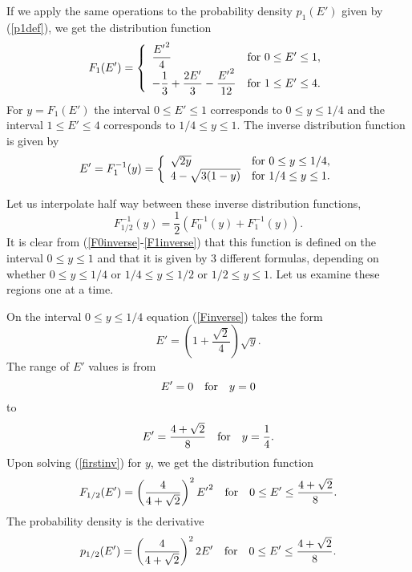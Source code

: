 \documentclass[11pt]{article}
\begin{document}
If we apply the same operations to the probability density
$p_1(E')$ given by (\ref{p1def}), we get the distribution
function
\[
  F_1(E') = \left\{
    \begin{array}{ll}
      {\displaystyle  \frac{{E'}^2}{4} }
         & \hbox{for $0 \le E' \le 1$}, \\
      {\displaystyle   -\frac{1}{3} + \frac{2E'}{3} - \frac{{E'}^2}{12} }
         & \hbox{for $1 \le E' \le 4$}.
    \end{array}
  \right.
\]
For $y = F_1(E')$ the interval $0 \le E' \le 1$ corresponds to
$0 \le y \le 1/4$ and the interval $1 \le E' \le 4$ corresponds 
to $1/4 \le y \le 1$.  The inverse distribution function is
given by
\begin{equation}
  E' = F_1^{-1}(y) = \left\{
    \begin{array}{ll}
      \sqrt{ 2y} & \hbox{for $0 \le y \le 1/4$}, \\
         4 - \sqrt{ 3(1-y) } & \hbox{for $1/4 \le y \le 1$}.
    \end{array}
  \right.
  \label{F1inverse}
\end{equation}

Let us interpolate half way between these inverse distribution functions,
\begin{equation}
  F_{1/2}^{-1}(y) = \frac{1}{2} ( F_0^{-1}(y) + F_1^{-1}(y) ).
 \label{Finverse}
\end{equation}
It is clear from (\ref{F0inverse}-\ref{F1inverse}) that this
function is defined on the interval $0 \le y \le 1$ and that
it is given by 3 different formulas, depending on whether
$0 \le y \le 1/4$ or $1/4 \le y \le 1/2$ or $1/2 \le y \le 1$.
Let us examine these regions one at a time.

On the interval $0 \le y \le 1/4$ equation (\ref{Finverse})
takes the form
\begin{equation}
  E' = \left(
    1 + \frac{\sqrt{2}}{4}
  \right)
  \sqrt{y}.
  \label{firstinv}
\end{equation}
The range of $E'$ values is from
\[
  E' = 0 \quad \hbox{for} \quad y = 0
\]
to
\[
  E' = \frac{4 + \sqrt{2}}{8} \quad \hbox{for} \quad y = \frac{1}{4}.
\]
Upon solving (\ref{firstinv}) for $y$, we get the distribution function
\[
  F_{1/2}(E') = \left(
    \frac{4}{4 + \sqrt{2}}
   \right)^2
    {E'}^2
   \quad \hbox{for} \quad 
  0 \le E' \le \frac{4 + \sqrt{2}}{8}.
\]
The probability density is the derivative
\[
  p_{1/2}(E') = \left(
    \frac{4}{4 + \sqrt{2}}
   \right)^2
    2E'
   \quad \hbox{for} \quad 
  0 \le E' \le \frac{4 + \sqrt{2}}{8}.
\]
\end{document}

